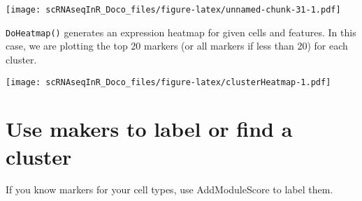 \documentclass[
]{book}
\newenvironment{Shaded}{\begin{snugshade}}{\end{snugshade}}
\newcommand{\AttributeTok}[1]{\textcolor[rgb]{0.13,0.29,0.53}{#1}}
\newcommand{\DecValTok}[1]{\textcolor[rgb]{0.00,0.00,0.81}{#1}}
\newcommand{\FunctionTok}[1]{\textcolor[rgb]{0.13,0.29,0.53}{\textbf{#1}}}
\newcommand{\NormalTok}[1]{#1}
\newcommand{\OtherTok}[1]{\textcolor[rgb]{0.56,0.35,0.01}{#1}}
\newcommand{\SpecialCharTok}[1]{\textcolor[rgb]{0.81,0.36,0.00}{\textbf{#1}}}
\begin{document}
\texttt{[image: scRNAseqInR\_Doco\_files/figure-latex/unnamed-chunk-31-1.pdf]}

\texttt{DoHeatmap()} generates an expression heatmap for given cells and features. In this case, we are plotting the top 20 markers (or all markers if less than 20) for each cluster.

\begin{Shaded}
\end{Shaded}

\texttt{[image: scRNAseqInR\_Doco\_files/figure-latex/clusterHeatmap-1.pdf]}

\hypertarget{use-makers-to-label-or-find-a-cluster}{%
\section{Use makers to label or find a cluster}\label{use-makers-to-label-or-find-a-cluster}}

If you know markers for your cell types, use AddModuleScore to label them.
\end{document}
